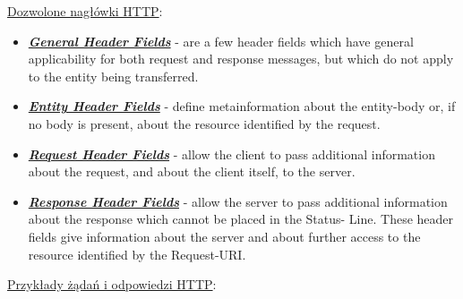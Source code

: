 \noindent \underline{Dozwolone nagłówki HTTP}: \\

\begin{itemize} 
\item \href{https://tools.ietf.org/html/rfc2616#section-4.5}{\textbf{\textit{General Header Fields}}} -  are a few header fields which have general applicability for
   both request and response messages, but which do not apply to the
   entity being transferred.

\item \href{https://tools.ietf.org/html/rfc2616#section-7.1}{\textbf{\textit{Entity Header Fields}}} -   define metainformation about the entity-body or, if no body is present, about the resource identified by the request.

\item \href{https://tools.ietf.org/html/rfc2616#section-5.3}{\textbf{\textit{Request Header Fields}}} - allow the client to pass additional   information about the request, and about the client itself, to the server.

\item \href{https://tools.ietf.org/html/rfc2616#section-6.2}{\textbf{\textit{Response Header Fields}}} -  allow the server to pass additional
   information about the response which cannot be placed in the Status-
   Line. These header fields give information about the server and about
   further access to the resource identified by the Request-URI.

\end{itemize}\mbox{}



\newpage 
\noindent \underline{Przykłady żądań i odpowiedzi HTTP}: \\

